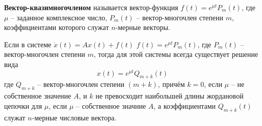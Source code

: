 \begin{definition}
  \textbf{Вектор-квазимногочленом} называется вектор-функция $f(t) = e^{\mu t} P_m(t)$, где $\mu$ -- заданное комплексное число, $P_m(t)$ -- вектор-многочлен степени $m$, коэффициентами которого служат $n$-мерные векторы. 
\end{definition}

\begin{theorem}
  Если в системе $\dot{x}(t) = A x(t) + f(t)$ $f(t) = e^{\mu t} P_m(t)$, где $P_m(t)$ -- вектор-многочлен степени $m$, тогда для этой системы всегда существует решение вида
  \[ x(t) = e^{\mu t} Q_{m+k}(t)\]
  где $Q_{m + k}$ -- вектор-многочлен степени $(m + k)$, причём $k = 0$, если $\mu$ -- не собственное значение $A$, и $k$ не превосходит наибольшей длины жордановой цепочки для $\mu$, если $\mu$ -- собственное значние $A$, а коэффициентами $Q_{m+k}(t)$ служат $n$-мерные числовые вектора.
\end{theorem}